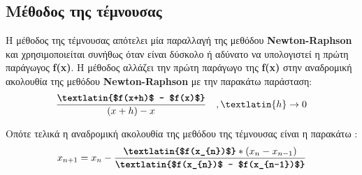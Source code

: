 \documentclass[First Project.tex]{subfiles}
\begin{document}
\subsection{ Μέθοδος της τέμνουσας }
Η μέθοδος της τέμνουσας απότελει μία παραλλαγή της μεθόδου \textlatin{\textbf{Newton-Raphson}} και χρησιμοποιείται συνήθως όταν είναι 
δύσκολο ή αδύνατο να υπολογιστεί η πρώτη παράγωγος \textlatin{\textbf{f(x)}}. Η μέθοδος αλλάζει την πρώτη παράγωγο της \textlatin{\textbf{f(x)}} στην
αναδρομική ακολουθία της μεθόδου \textlatin{\textbf{Newton-Raphson}} με την παρακάτω παράσταση:
\begin{equation*}
    \frac{\textbf{\textlatin{$f(x+h)$ - $f(x)$}}}{(x+h) - x} \quad, \textlatin{h}  \rightarrow 0
\end{equation*}

Οπότε τελικά η αναδρομική ακολουθία της μεθόδου της τέμνουσας είναι η παρακάτω :
\begin{equation*}
    x_{n+1} = x_{n} - \frac{\textbf{\textlatin{$f(x_{n})$}} * ( x_{n} - x_{n-1})} { \textbf{\textlatin{$f(x_{n})$ - $f(x_{n-1})$}} }
\end{equation*}
\end{document}
